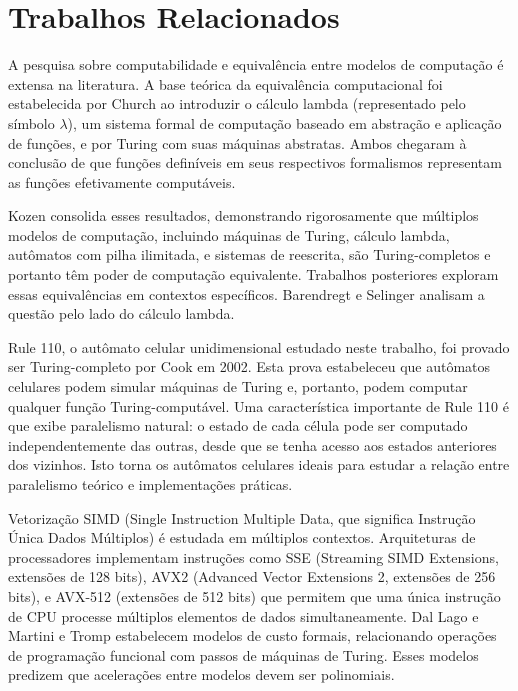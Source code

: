 \documentclass[12pt]{article}
\begin{document}
\section{Trabalhos Relacionados}

A pesquisa sobre computabilidade e equivalência entre modelos de computação é extensa na literatura. A base teórica da equivalência computacional foi estabelecida por Church \cite{church1936} ao introduzir o cálculo lambda (representado pelo símbolo $\lambda$), um sistema formal de computação baseado em abstração e aplicação de funções, e por Turing \cite{turing1936} com suas máquinas abstratas. Ambos chegaram à conclusão de que funções definíveis em seus respectivos formalismos representam as funções efetivamente computáveis.

Kozen \cite{kozen1997} consolida esses resultados, demonstrando rigorosamente que múltiplos modelos de computação, incluindo máquinas de Turing, cálculo lambda, autômatos com pilha ilimitada, e sistemas de reescrita, são Turing-completos e portanto têm poder de computação equivalente. Trabalhos posteriores exploram essas equivalências em contextos específicos. Barendregt \cite{barendregt1984} e Selinger \cite{selinger2004} analisam a questão pelo lado do cálculo lambda.

Rule 110, o autômato celular unidimensional estudado neste trabalho, foi provado ser Turing-completo por Cook em 2002. Esta prova estabeleceu que autômatos celulares podem simular máquinas de Turing e, portanto, podem computar qualquer função Turing-computável. Uma característica importante de Rule 110 é que exibe paralelismo natural: o estado de cada célula pode ser computado independentemente das outras, desde que se tenha acesso aos estados anteriores dos vizinhos. Isto torna os autômatos celulares ideais para estudar a relação entre paralelismo teórico e implementações práticas.

Vetorização SIMD (Single Instruction Multiple Data, que significa Instrução Única Dados Múltiplos) é estudada em múltiplos contextos. Arquiteturas de processadores implementam instruções como SSE (Streaming SIMD Extensions, extensões de 128 bits), AVX2 (Advanced Vector Extensions 2, extensões de 256 bits), e AVX-512 (extensões de 512 bits) que permitem que uma única instrução de CPU processe múltiplos elementos de dados simultaneamente. Dal Lago e Martini \cite{dallago2009} e Tromp \cite{tromp2006} estabelecem modelos de custo formais, relacionando operações de programação funcional com passos de máquinas de Turing. Esses modelos predizem que acelerações entre modelos devem ser polinomiais.
\end{document}
